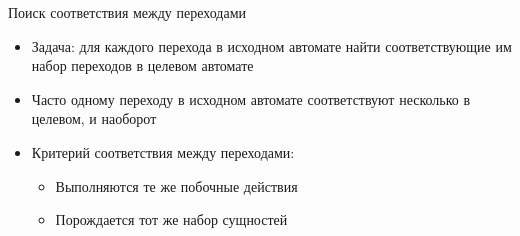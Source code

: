 \documentclass[12pt]{beamer}
\begin{document}
{
\begin{frame}{Поиск соответствия между переходами}
  \begin{mybox}[]
  \begin{itemize}
  \item Задача: для каждого перехода в исходном автомате найти соответствующие им набор переходов в целевом автомате
  \item Часто одному переходу в исходном автомате соответствуют несколько в целевом, и наоборот
  \item Критерий соответствия между переходами:
  \begin{itemize}
 	  	\item Выполняются те же побочные действия
 	  	\item Порождается тот же набор сущностей
  \end{itemize}
  \end{itemize}
  \end{mybox}
\end{frame}
}
\end{document}
